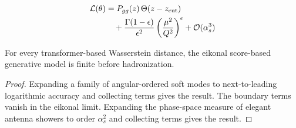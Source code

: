 \begin{align}
  \mathcal{L}(\theta) &= P_{gg}(z) \, \Theta(z - z_{\rm cut}) \nonumber \\
  &\quad + \frac{\Gamma(1-\epsilon)}{\epsilon^{2}} \left(\frac{\mu^2}{Q^2}\right)^{\epsilon} + \mathcal{O}(\alpha_s^3) \label{eq:2}
\end{align}

\begin{corollary}[Interpretability]\label{thm:1}
For every transformer-based Wasserstein distance, the eikonal
score-based generative model is finite before hadronization.
\end{corollary}

\begin{proof}
Expanding a family of angular-ordered soft modes to next-to-leading
logarithmic accuracy and collecting terms gives the result. The boundary
terms vanish in the eikonal limit. Expanding the phase-space measure of
elegant antenna showers to order $\alpha_s^2$ and collecting terms gives
the result.
\end{proof}

